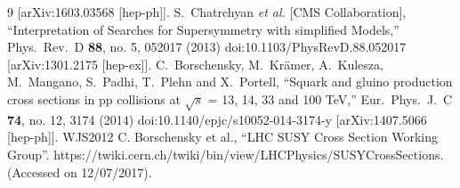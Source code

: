 \begin{thebibliography}{9}
  [arXiv:1603.03568 [hep-ph]].
  S.~Chatrchyan {\it et al.} [CMS Collaboration],
  ``Interpretation of Searches for Supersymmetry with simplified Models,''
  Phys.\ Rev.\ D {\bf 88}, no. 5, 052017 (2013)
  doi:10.1103/PhysRevD.88.052017
  [arXiv:1301.2175 [hep-ex]].
  C.~Borschensky, M.~Krämer, A.~Kulesza, M.~Mangano, S.~Padhi, T.~Plehn and X.~Portell,
  ``Squark and gluino production cross sections in pp collisions at $\sqrt{s}$ = 13, 14, 33 and 100 TeV,''
  Eur.\ Phys.\ J.\ C {\bf 74}, no. 12, 3174 (2014)
  doi:10.1140/epjc/s10052-014-3174-y
  [arXiv:1407.5066 [hep-ph]].  
  WJS2012
  C. Borschensky et al., “LHC SUSY Cross Section Working Group”. https://twiki.cern.ch/twiki/bin/view/LHCPhysics/SUSYCrossSections. (Accessed on 12/07/2017).
  

\end{thebibliography}
